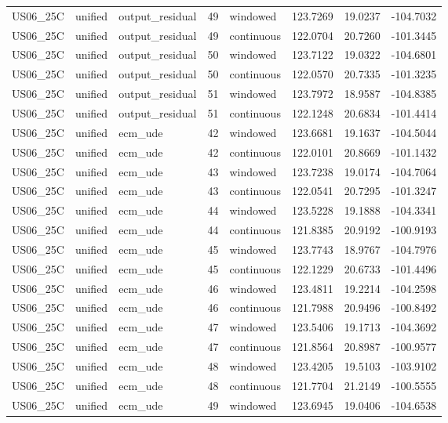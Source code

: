 \begin{tabular}{llllllll}
US06\_25C & unified & output\_residual & 49 & windowed & 123.7269 & 19.0237 & -104.7032 \\
US06\_25C & unified & output\_residual & 49 & continuous & 122.0704 & 20.7260 & -101.3445 \\
US06\_25C & unified & output\_residual & 50 & windowed & 123.7122 & 19.0322 & -104.6801 \\
US06\_25C & unified & output\_residual & 50 & continuous & 122.0570 & 20.7335 & -101.3235 \\
US06\_25C & unified & output\_residual & 51 & windowed & 123.7972 & 18.9587 & -104.8385 \\
US06\_25C & unified & output\_residual & 51 & continuous & 122.1248 & 20.6834 & -101.4414 \\
US06\_25C & unified & ecm\_ude & 42 & windowed & 123.6681 & 19.1637 & -104.5044 \\
US06\_25C & unified & ecm\_ude & 42 & continuous & 122.0101 & 20.8669 & -101.1432 \\
US06\_25C & unified & ecm\_ude & 43 & windowed & 123.7238 & 19.0174 & -104.7064 \\
US06\_25C & unified & ecm\_ude & 43 & continuous & 122.0541 & 20.7295 & -101.3247 \\
US06\_25C & unified & ecm\_ude & 44 & windowed & 123.5228 & 19.1888 & -104.3341 \\
US06\_25C & unified & ecm\_ude & 44 & continuous & 121.8385 & 20.9192 & -100.9193 \\
US06\_25C & unified & ecm\_ude & 45 & windowed & 123.7743 & 18.9767 & -104.7976 \\
US06\_25C & unified & ecm\_ude & 45 & continuous & 122.1229 & 20.6733 & -101.4496 \\
US06\_25C & unified & ecm\_ude & 46 & windowed & 123.4811 & 19.2214 & -104.2598 \\
US06\_25C & unified & ecm\_ude & 46 & continuous & 121.7988 & 20.9496 & -100.8492 \\
US06\_25C & unified & ecm\_ude & 47 & windowed & 123.5406 & 19.1713 & -104.3692 \\
US06\_25C & unified & ecm\_ude & 47 & continuous & 121.8564 & 20.8987 & -100.9577 \\
US06\_25C & unified & ecm\_ude & 48 & windowed & 123.4205 & 19.5103 & -103.9102 \\
US06\_25C & unified & ecm\_ude & 48 & continuous & 121.7704 & 21.2149 & -100.5555 \\
US06\_25C & unified & ecm\_ude & 49 & windowed & 123.6945 & 19.0406 & -104.6538 \\

\end{tabular}
